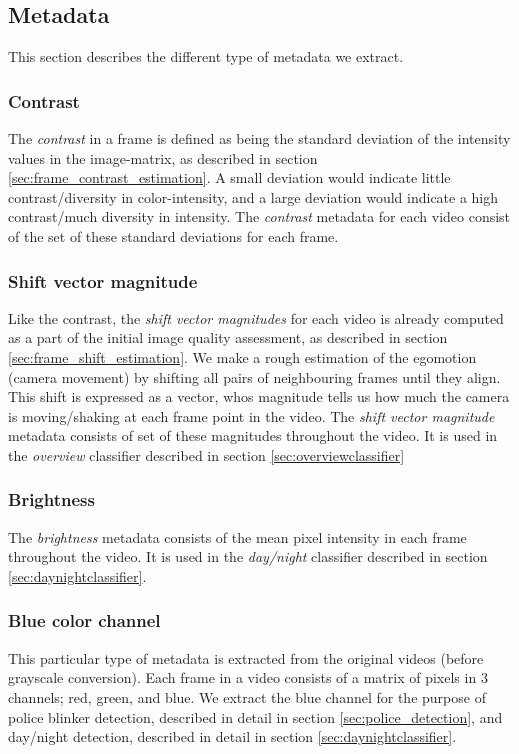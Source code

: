 \subsection{Metadata}
%
This section describes the different type of metadata we extract.
%
\subsubsection{Contrast}\label{sec:contrastdata}
%
The \textit{contrast} in a frame is defined as being the standard deviation of the intensity values in the image-matrix, as described in section \ref{sec:frame_contrast_estimation}. A small deviation would indicate little contrast/diversity in color-intensity, and a large deviation would indicate a high contrast/much diversity in intensity. The \textit{contrast} metadata for each video consist of the set of these standard deviations for each frame.
%
\subsubsection{Shift vector magnitude}\label{sec:svmdata}
%
Like the contrast, the \textit{shift vector magnitudes} for each video is already computed as a part of the initial image quality assessment, as described in section \ref{sec:frame_shift_estimation}. We make a rough estimation of the egomotion (camera movement) by shifting all pairs of neighbouring frames until they align. This shift is expressed as a vector, whos magnitude tells us how much the camera is moving/shaking at each frame point in the video. The \textit{shift vector magnitude} metadata consists of set of these magnitudes throughout the video. It is used in the \textit{overview} classifier described in section \ref{sec:overviewclassifier}
%
\subsubsection{Brightness}\label{sec:brightnessdata}
%
The \textit{brightness} metadata consists of the mean pixel intensity in each frame throughout the video. It is used in the \textit{day/night} classifier described in section \ref{sec:daynightclassifier}.
%
\subsubsection{Blue color channel}\label{sec:blue_channel}
%
This particular type of metadata is extracted from the original videos (before grayscale conversion). Each frame in a video consists of a matrix of pixels in 3 channels; red, green, and blue. We extract the blue channel for the purpose of police blinker detection, described in detail in section \ref{sec:police_detection}, and day/night detection, described in detail in section \ref{sec:daynightclassifier}.
%
